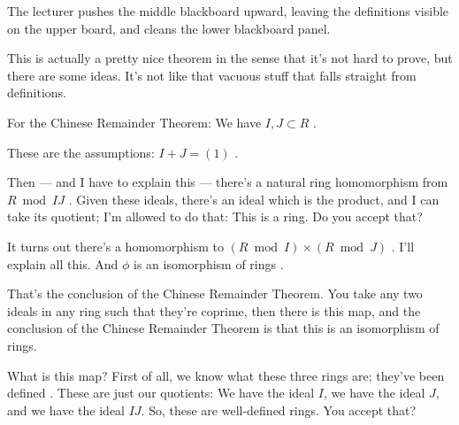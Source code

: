 \begin{note}
The lecturer pushes the middle blackboard upward, leaving the definitions visible on the upper board, and cleans the lower blackboard panel.
\end{note}

\begin{speech}[01:18:15 - 01:19:50]
This is actually a pretty nice theorem in the sense that it's not hard to prove, but there are some ideas. It's not like that vacuous stuff that falls straight from definitions.

For the Chinese Remainder Theorem: We have $I, J \subset R$ .

These are the assumptions: $I + J = (1)$ .

Then --- and I have to explain this --- there's a natural ring homomorphism from $R \bmod IJ$ . Given these ideals, there's an ideal which is the product, and I can take its quotient; I'm allowed to do that: This is a ring. Do you accept that?

It turns out there's a homomorphism to $(R \bmod I) \times (R \bmod J)$ . I'll explain all this. And $\phi$ is an isomorphism of rings .

That's the conclusion of the Chinese Remainder Theorem. You take any two ideals in any ring such that they're coprime, then there is this map, and the conclusion of the Chinese Remainder Theorem is that this is an isomorphism of rings.

What is this map? First of all, we know what these three rings are; they've been defined . These are just our quotients: We have the ideal $I$, we have the ideal $J$, and we have the ideal $IJ$. So, these are well-defined rings. You accept that?
\end{speech}

\begin{content}
\end{content}

